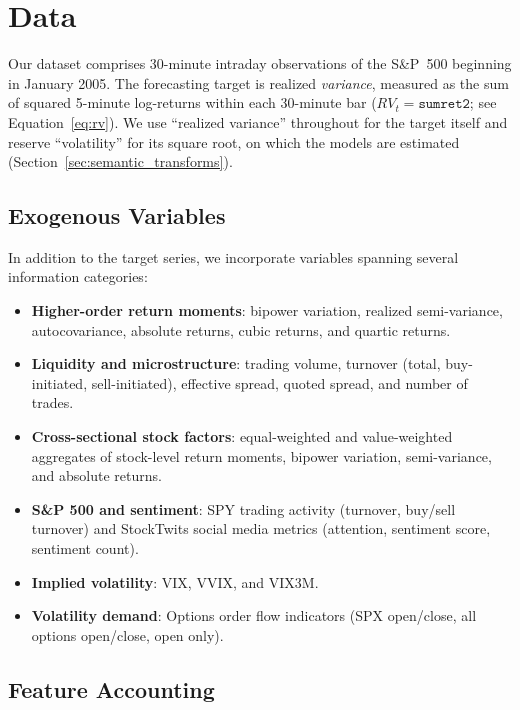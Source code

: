 \section{Data}
\label{sec:data}

Our dataset comprises 30-minute intraday observations of the S\&P~500
beginning in January 2005. The forecasting target is realized
\emph{variance}, measured as the sum of squared 5-minute log-returns within
each 30-minute bar ($RV_t = \texttt{sumret2}$; see
Equation~\eqref{eq:rv}). We use ``realized variance'' throughout for the
target itself and reserve ``volatility'' for its square root, on which the
models are estimated (Section~\ref{sec:semantic_transforms}).

\subsection{Exogenous Variables}
\label{sec:exog_vars}

In addition to the target series, we incorporate variables spanning several
information categories:

\begin{itemize}
    \item \textbf{Higher-order return moments}: bipower variation, realized semi-variance, autocovariance, absolute returns, cubic returns, and quartic returns.
    \item \textbf{Liquidity and microstructure}: trading volume, turnover (total, buy-initiated, sell-initiated), effective spread, quoted spread, and number of trades.
    \item \textbf{Cross-sectional stock factors}: equal-weighted and value-weighted aggregates of stock-level return moments, bipower variation, semi-variance, and absolute returns.
    \item \textbf{S\&P 500 and sentiment}: SPY trading activity (turnover, buy/sell turnover) and StockTwits social media metrics (attention, sentiment score, sentiment count).
    \item \textbf{Implied volatility}: VIX, VVIX, and VIX3M.
    \item \textbf{Volatility demand}: Options order flow indicators (SPX open/close, all options open/close, open only).
\end{itemize}

\subsection{Feature Accounting}
\label{sec:feature_accounting}

